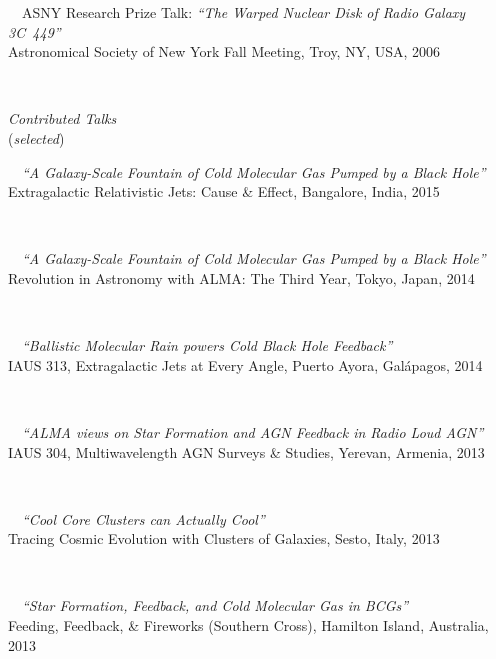 \documentclass[11pt]{article}
\begin{document}
\hspace{42mm} \parbox{5.15in}{
\textbullet~~ASNY Research Prize Talk: \textit{``The Warped Nuclear Disk of Radio Galaxy 3C~449''}\\ Astronomical Society of New York Fall Meeting, Troy, NY, USA, 2006}\\




\vspace{4mm}



\hspace{2.5mm} \parbox{1.5in}{\textit{Contributed Talks}\\ (\textit{selected})} \parbox{5.15in}{
\textbullet~~\textit{``A Galaxy-Scale Fountain of Cold Molecular Gas Pumped by a Black Hole''} \\
Extragalactic Relativistic Jets: Cause \& Effect, Bangalore, India, 2015}\\


\hspace{42mm} \parbox{5.15in}{
\textbullet~~\textit{``A Galaxy-Scale Fountain of Cold Molecular Gas Pumped by a Black Hole''} \\
Revolution in Astronomy with ALMA: The Third Year, Tokyo, Japan, 2014}\\


\hspace{42mm} \parbox{5.15in}{
\textbullet~~\textit{``Ballistic Molecular Rain powers Cold Black Hole Feedback''} \\
IAUS 313, Extragalactic Jets at Every Angle, Puerto Ayora, Gal\'{a}pagos, 2014}\\

\hspace{42mm} \parbox{5.15in}{
\textbullet~~\textit{``ALMA views on Star Formation and AGN Feedback in Radio Loud AGN''} \\
IAUS 304, Multiwavelength AGN Surveys \& Studies, Yerevan, Armenia, 2013}\\


\hspace{42mm} \parbox{5.15in}{
\textbullet~~\textit{``Cool Core Clusters can Actually Cool''} \\ Tracing Cosmic Evolution with Clusters of Galaxies, Sesto, Italy, 2013} \\


\hspace{42mm} \parbox{5.15in}{
\textbullet~~\textit{``Star Formation, Feedback, and Cold Molecular Gas in BCGs''} \\ Feeding, Feedback, \& Fireworks (Southern Cross), Hamilton Island, Australia, 2013} \\
\end{document}
